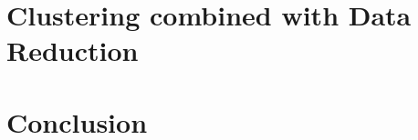 \documentclass[english]{article}\usepackage{graphicx, color}
\numberwithin{equation}{section}
\numberwithin{figure}{section}
\begin{document}
\section{Clustering combined with Data Reduction}
\label{sec:clustering}








\section{Conclusion}
\label{sec:conc}





\end{document}
